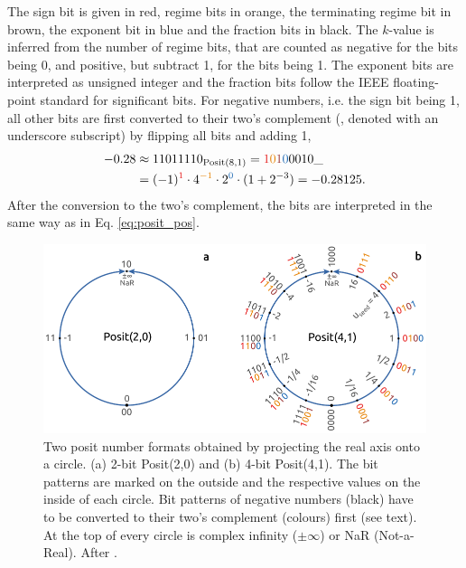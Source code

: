 \documentclass[draft]{agujournal2019}
\newcommand{\op}{\operatorname}
\begin{document}
The sign bit is given in red, regime bits in orange, the terminating regime bit in brown, the exponent bit in blue and the fraction bits in black. The $k$-value is inferred from the number of regime bits, that are counted as negative for the bits being 0, and positive, but subtract 1, for the bits being 1. The exponent bits are interpreted as unsigned integer and the fraction bits follow the IEEE floating-point standard for significant bits. For negative numbers, i.e. the sign bit being 1, all other bits are first converted to their two's complement (, denoted with an underscore subscript) by flipping all bits and adding 1,
\begin{equation}
\begin{split}
-0.28 &  \approx 11011110_{\op{Posit}(8,1)} = {\color{psign}1}{\color{pregime}0}{\color{pregimet}1}{\color{pexpo}0}0010\_ \\
& = (-1)^{\color{psign}1} \cdot 4^{\color{pregime}-1} \cdot 2^{\color{pexpo}0} \cdot (1+2^{-3}) = -0.28125.
\end{split}
\label{eq:2comp}
\end{equation}
After the conversion to the two's complement, the bits are interpreted in the same way as in Eq. \ref{eq:posit_pos}.

\begin{figure}[htbp]
\center
\includegraphics[width=1\textwidth]{figs/circles.pdf}
\caption{Two posit number formats obtained by projecting the real axis onto a circle. (a) 2-bit Posit(2,0) and (b) 4-bit Posit(4,1). The bit patterns are marked on the outside and the respective values on the inside of each circle. Bit patterns of negative numbers (black) have to be converted to their two's complement (colours) first (see text). At the top of every circle is complex infinity ($\pm \infty$) or NaR (Not-a-Real). After . }
\label{fig:circle}
\end{figure}
\end{document}

